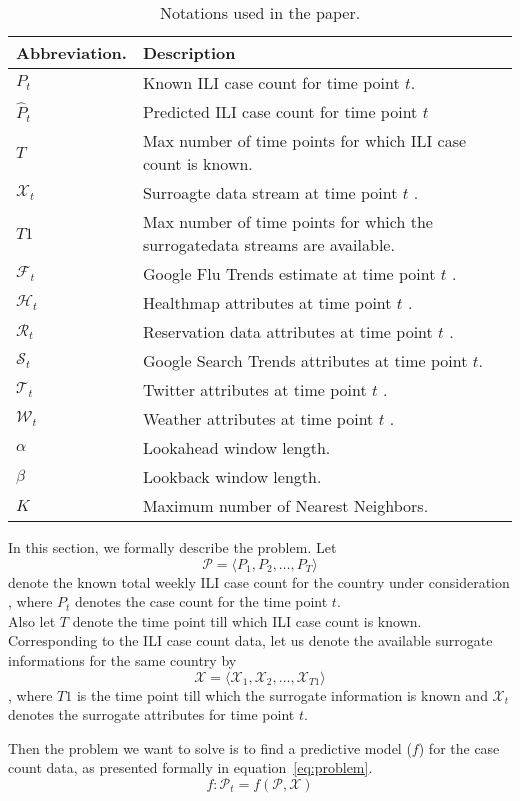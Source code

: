 
\begin{table*}[t!]
  \centering
  \begin{tabular}{|*{2}{l|}}
    \hline
    Abbreviation. & Description \\
    \hline \hline
    ${P}_t$         & Known ILI case count for time point $t$.\\
    $\hat{P}_t$     & Predicted ILI case count for time point $t$ \\
    $T$             & Max number of time points for which ILI case count is known.\\
    $\mathcal{X}_t$ & Surroagte data stream at time point $t$ .\\
    $T1$            & Max number of time points for which the surrogatedata streams are available.\\
    $\mathcal{F}_t$ & Google Flu Trends estimate at time point $t$ .\\
    $\mathcal{H}_t$ & Healthmap attributes at time point $t$ .\\
    $\mathcal{R}_t$ & Reservation data attributes at time point $t$ .\\
    $\mathcal{S}_t$ & Google Search Trends attributes at time point $t$.\\
    $\mathcal{T}_t$ & Twitter attributes at time point $t$ .\\
    $\mathcal{W}_t$ & Weather attributes at time point $t$ .\\
    $\alpha$        & Lookahead window length.\\
    $\beta$         & Lookback window length.\\
    $K$             & Maximum number of Nearest Neighbors.\\
    \hline
  \end{tabular}
  \caption{\label{tb:notations} Notations used in the paper.
  }
\end{table*}

In this section, we formally describe the problem.
Let 
\[\mathcal{P} = \langle {P}_1, {P}_2, \dots,{P}_T \rangle\]
denote the known total weekly ILI case count for the country under
consideration , where ${P}_t$  denotes the case count for
the time point $t$.\\
Also let $T$ denote the time point till which ILI case count is known.
Corresponding to the ILI case count data, let us denote the available surrogate informations
for the same country by 
\[\mathcal{X} = \langle \mathcal{X}_1, \mathcal{X}_2, \dots, \mathcal{X}_{T1}\rangle\]
, where $T1$ is the time point till which the surrogate
information is known and $\mathcal{X}_{t}$ denotes the surrogate attributes for time
point $t$. 

Then the problem we want to solve is to find a predictive model ($f$)  for the 
case count data, as presented formally in equation~\ref{eq:problem}.
\begin{equation}
  \label{eq:problem}
  f: \mathcal{P}_t = f\left(\mathcal{P}, \mathcal{X}\right)
\end{equation}


